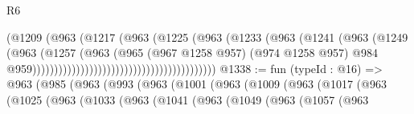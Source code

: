 \begin{lexlean}{R6}
\begin{coremodule}
                                                          (@1209
                                                            (@963
                                                              (@1217
                                                                (@963
                                                                  (@1225
                                                                    (@963
                                                                      (@1233
                                                                        (@963
                                                                          (@1241
                                                                            (@963
                                                                              (@1249
                                                                                (@963
                                                                                  (@1257
                                                                                    (@963
                                                                                      (@965
                                                                                        (@967
                                                                                          @1258
                                                                                          @957)
                                                                                        (@974
                                                                                          @1258
                                                                                          @957)
                                                                                        @984
                                                                                        @959))))))))))))))))))))))))))))))))))))))))))
@1338 := fun (typeId : @16) =>
  @963
    (@985
      (@963
        (@993
          (@963
            (@1001
              (@963
                (@1009
                  (@963
                    (@1017
                      (@963
                        (@1025
                          (@963
                            (@1033
                              (@963
                                (@1041
                                  (@963
                                    (@1049
                                      (@963
                                        (@1057
                                          (@963

\end{coremodule}
\end{lexlean}
